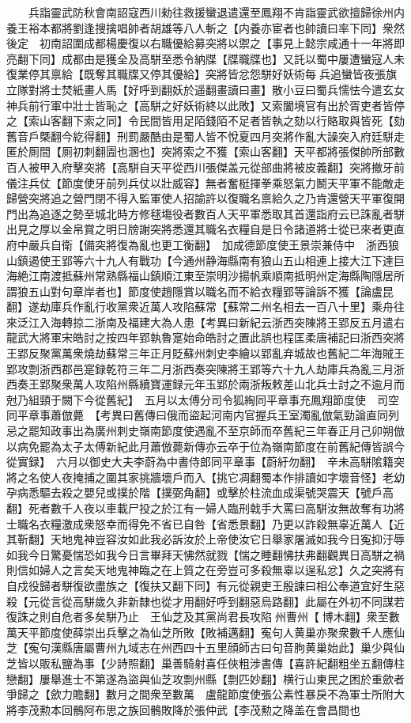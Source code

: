 　　兵詣靈武防秋會南詔寇西川勑往救援蠻退遣還至鳳翔不肯詣靈武欲擅歸徐州内養王裕本都將劉逢搜擒唱帥者胡雄等八人斬之【内養亦宦者也帥讀曰率下同】衆然後定　初南詔圍成都楊慶復以右職優給募突將以禦之【事見上懿宗咸通十一年將即亮翻下同】成都由是獲全及高駢至悉令納牒【牒職牒也】又託以蜀中屢遭蠻寇人未復業停其禀給【既奪其職牒又停其優給】突將皆忿怨駢好妖術每兵追蠻皆夜張旗立隊對將士焚紙畫人馬【好呼到翻妖於遥翻畫讀曰畫】散小豆曰蜀兵懦怯今遣玄女神兵前行軍中壯士皆恥之【高駢之好妖術終以此敗】又索闔境官有出於胥吏者皆停之【索山客翻下索之同】令民間皆用足陌錢陌不足者皆執之劾以行賂取與皆死【劾舊音戶槩翻今紇得翻】刑罰嚴酷由是蜀人皆不悅夏四月突將作亂大譟突入府廷駢走匿於厠間【厠初刺翻圊也溷也】突將索之不獲【索山客翻】天平都將張傑帥所部數百人被甲入府擊突將【高駢自天平從西川張傑盖元從部曲將被皮義翻】突將撤牙前儀注兵仗【節度使牙前列兵仗以壯威容】無者奮梃揮拳乘怒氣力鬭天平軍不能敵走歸營突將追之營門閉不得入監軍使人招諭許以復職名禀給久之乃肯還營天平軍復開門出為追逐之勢至城北時方修毬塲役者數百人天平軍悉取其首還詣府云已誅亂者駢出見之厚以金帛賞之明日牓謝突將悉還其職名衣糧自是日令諸道將士從已來者更直府中嚴兵自衛【備突將復為亂也更工衡翻】　加成德節度使王景崇兼侍中　浙西狼山鎮遏使王郢等六十九人有戰功【今通州静海縣南有狼山五山相連上接大江下達巨海絶江南渡抵蘇州常熟縣福山鎮順江東至崇明沙揚帆乘順南抵明州定海縣陶隱居所謂狼五山對句章岸者也】節度使趙隱賞以職名而不給衣糧郢等論訴不獲【論盧昆翻】遂劫庫兵作亂行收黨衆近萬人攻陷蘇常【蘇常二州名相去一百八十里】乘舟往來泛江入海轉掠二浙南及福建大為人患【考異曰新紀云浙西突陳將王郢反五月遣右龍武大將軍宋皓討之按四年郢執魯寔始命皓討之置此誤也程匡柔唐補記曰浙西突將王郢反聚黨萬衆燒劫蘇常三年正月貶蘇州刺史李繪以郢亂弃城故也舊紀二年海賊王郢攻剽浙西郡邑寔録乾符三年二月浙西奏突陳將王郢等六十九人劫庫兵為亂三月浙西奏王郢聚衆萬人攻陷州縣續寶運録元年玉郢於兩浙叛敕差山北兵士討之不逾月而尅乃組頸于闕下今從舊紀】　五月以太傅分司令狐綯同平章事充鳳翔節度使　司空同平章事蕭倣薨　【考異曰舊傳曰俄而盜起河南内官握兵王室濁亂倣氣勁論直同列忌之罷知政事出為廣州刺史嶺南節度使遇亂不至京師而卒舊紀三年春正月己卯朔倣以病免罷為太子太傅新紀此月蕭倣薨新傳亦云卒于位為嶺南節度在前舊紀傳皆誤今從實録】　六月以御史大夫李蔚為中書侍郎同平章事【蔚紆勿翻】　辛未高駢隂籍突將之名使人夜掩捕之圍其家挑牆壞戶而入【挑它凋翻蜀本作排讀如字壞音怪】老幼孕病悉驅去殺之嬰兒或撲於階【撲弼角翻】或擊於柱流血成渠號哭震天【號戶高翻】死者數千人夜以車載尸投之於江有一婦人臨刑戟手大罵曰高駢汝無故奪有功將士職名衣糧激成衆怒幸而得免不省已自咎【省悉景翻】乃更以詐殺無辜近萬人【近其靳翻】天地鬼神豈容汝如此我必訴汝於上帝使汝它日舉家屠滅如我今日寃抑汙辱如我今日驚憂惴恐如我今日言畢拜天怫然就戮【惴之睡翻怫扶弗翻觀異日高駢之禍則信如婦人之言矣天地鬼神臨之在上質之在旁豈可多殺無辜以逞私忿】久之突將有自戍役歸者駢復欲盡族之【復扶又翻下同】有元從親吏王殷諫曰相公奉道宜好生惡殺【元從言從高駢歲久非新隸也從才用翻好呼到翻惡烏路翻】此屬在外初不同謀若復誅之則自危者多矣駢乃止　王仙芝及其黨尚君長攻陷州曹州【博木翻】衆至數萬天平節度使薛崇出兵擊之為仙芝所敗【敗補邁翻】寃句人黄巢亦聚衆數千人應仙芝【寃句漢縣唐屬曹州九域志在州西四十五里顔師古曰句音胊黄巢始此】巢少與仙芝皆以販私鹽為事【少詩照翻】巢善騎射喜任俠粗涉書傳【喜許紀翻粗坐五翻傳柱戀翻】屢舉進士不第遂為盜與仙芝攻剽州縣【剽匹妙翻】横行山東民之困於重歛者爭歸之【歛力贍翻】數月之間衆至數萬　盧龍節度使張公素性暴戾不為軍士所附大將李茂勲本回鶻阿布思之族回鶻敗降於張仲武【李茂勲之降盖在會昌間也